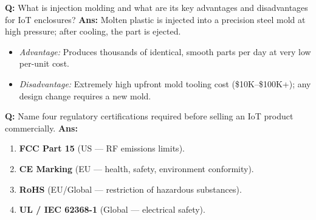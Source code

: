\documentclass[10pt,a4paper,twocolumn]{article}
\begin{document}
\begin{tcolorbox}[
  colback=white,
  colframe=UnitColorNine,
  colbacktitle=gray!10!white,
  coltitle=black,
  fonttitle=\bfseries\sffamily\small,
  title={Unit IX $\bullet$ Card 8},
  boxrule=1.2pt,
  arc=2mm,
  outer arc=2mm,
  boxsep=1.5mm,
  top=1mm,
  bottom=1mm,
  left=1.5mm,
  right=1.5mm,
  before skip=2.5mm,
  after skip=2.5mm
]
\textbf{Q:} What is injection molding and what are its key advantages and disadvantages for IoT enclosures?
\tcbline
\textbf{Ans:} Molten plastic is injected into a precision steel mold at high pressure; after cooling, the part is ejected.  
\begin{itemize}
  \item \textit{Advantage:} Produces thousands of identical, smooth parts per day at very low per-unit cost.
  \item \textit{Disadvantage:} Extremely high upfront mold tooling cost (\$10K–\$100K+); any design change requires a new mold.
\end{itemize}
\end{tcolorbox}


\begin{tcolorbox}[
  colback=white,
  colframe=UnitColorNine,
  colbacktitle=gray!10!white,
  coltitle=black,
  fonttitle=\bfseries\sffamily\small,
  title={Unit IX $\bullet$ Card 9},
  boxrule=1.2pt,
  arc=2mm,
  outer arc=2mm,
  boxsep=1.5mm,
  top=1mm,
  bottom=1mm,
  left=1.5mm,
  right=1.5mm,
  before skip=2.5mm,
  after skip=2.5mm
]
\textbf{Q:} Name four regulatory certifications required before selling an IoT product commercially.
\tcbline
\textbf{Ans:} \begin{enumerate}
  \item \textbf{FCC Part 15} (US — RF emissions limits).
  \item \textbf{CE Marking} (EU — health, safety, environment conformity).
  \item \textbf{RoHS} (EU/Global — restriction of hazardous substances).
  \item \textbf{UL / IEC 62368-1} (Global — electrical safety).
\end{enumerate}
\end{tcolorbox}
\end{document}
